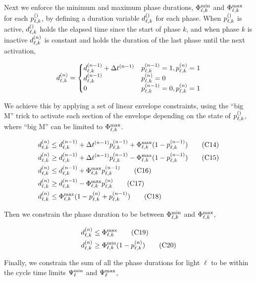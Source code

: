 Next we enforce the minimum and maximum phase durations, $\PTMIN{\ell}{k}$ and
$\PTMAX{\ell}{k}$ for each $\p[]{\ell}{k}$, by defining a duration variable
$\pd[]{\ell}{k}$ for each phase. When $\p[]{\ell}{k}$ is active,
$\pd[]{\ell}{k}$ holds the elapsed time since the start of phase $k$, and when
phase $k$ is inactive $\pd{\ell}{k}$ is constant and holds the duration of the
last phase until the next activation,

\begin{equation}
\pd{\ell}{k} = 
\begin{cases}
\pd[n-1]{\ell}{k} + \DT[n-1] & \p[n-1]{\ell}{k}=1,\p{\ell}{k}=1\\
\pd[n-1]{\ell}{k} & \p{\ell}{k}=0\\
0 & \p[n-1]{\ell}{k}=0,\p{\ell}{k}=1
\end{cases}
\end{equation}

We achieve this by applying a set of linear envelope constraints, using the
``big M'' trick to activate each section of the envelope depending on the state
of $\p[]{\ell}{k}$, where ``big M'' can be limited to $\PTMAX{\ell}{k}$.

\begin{align}
\pd{\ell}{k} &\le \pd[n-1]{\ell}{k} + \DT[n-1] \p[n-1]{\ell}{k} + \PTMAX{\ell}{k} (1 - \p[n-1]{\ell}{k})\tag{C14}\label{eq:C14}\\
\pd{\ell}{k} &\ge \pd[n-1]{\ell}{k} + \DT[n-1] \p[n-1]{\ell}{k} - \PTMAX{\ell}{k} (1 - \p[n-1]{\ell}{k})\tag{C15}\label{eq:C15}\\
\pd{\ell}{k} &\le \pd[n-1]{\ell}{k} + \PTMAX{\ell}{k} \p[n-1]{\ell}{k}\tag{C16}\label{eq:C16}\\
\pd{\ell}{k} &\ge \pd[n-1]{\ell}{k} - \PTMAX{\ell}{k} \p{\ell}{k}\tag{C17}\label{eq:C17}\\
\pd{\ell}{k} &\le \PTMAX{\ell}{k}(1 - \p{\ell}{k} + \p[n-1]{\ell}{k})\tag{C18}\label{eq:C18}
\end{align}

Then we constrain the phase duration to be between $\PTMIN{\ell}{k}$ and $\PTMAX{\ell}{k}$,

\begin{align}
\pd{\ell}{k} &\le \PTMAX{\ell}{k}\tag{C19}\label{eq:C19}\\
\pd{\ell}{k} &\ge \PTMIN{\ell}{k}(1 - \p{\ell}{k})\tag{C20}\label{eq:C20}
\end{align}

Finally, we constrain the sum of all the phase durations for light $\ell$ to be
within the cycle time limits $\CTMIN{\ell}$ and $\CTMAX{\ell}$,

